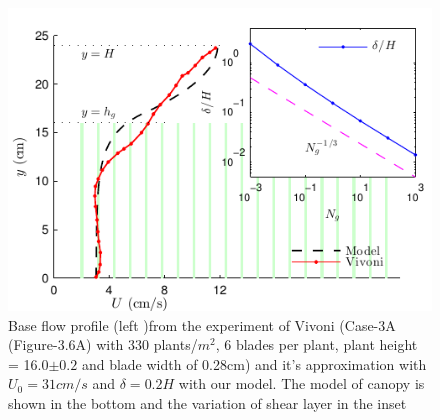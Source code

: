 \documentclass[aps,prl,twocolumn,showpacs,superscriptaddress,groupedaddress,10pt]{revtex4-1}  %
\begin{document}
\begin{figure}[htb]
\includegraphics[scale=1]{Grass_Base_Vivoni_shear}
\caption{Base flow profile (left )from the experiment of Vivoni\cite{Vivoni98} (Case-3A (Figure-3.6A) with 330 plants/$m^2$, 6 blades per plant, 
plant height = 16.0$\pm0.2$ and blade width of 0.28cm)
 and it's approximation with $U_0=31cm/s$ and $\delta = 0.2H$ with our model. The model of canopy is shown in the bottom and the variation of shear layer in the inset }
\label{fig:basicflow}
\end{figure}
\end{document}
